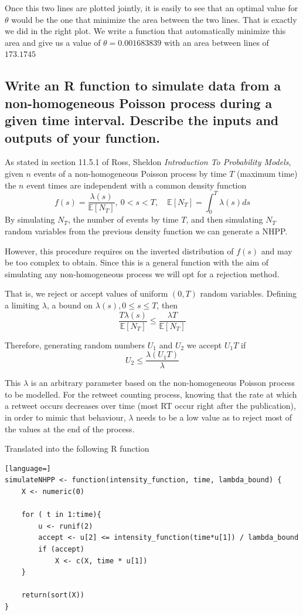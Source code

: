 Once this two lines are plotted jointly, it is easily to see that an optimal value for $\theta$ would be the one that minimize the area between the two lines. 
That is exactly we did in the right plot. 
We write a function that automatically minimize this area and give us a value of $\theta=0.001683839$ with an area between lines of $173.1745$

\subsection{Write an R function to simulate data from a non-homogeneous Poisson process during a given time interval. Describe the inputs and outputs of your function.}

As stated in section 11.5.1 of Ross, Sheldon \textit{Introduction To Probability Models}, given $n$ events of a non-homogeneous Poisson process by time $T$ (maximum time) the $n$ event times are independent with a common density function
\[f(s) = \frac{\lambda(s)}{\mathbb{E}[N_T]},\ 0<s<T, \quad \mathbb{E}[N_T] = \int^T_0\lambda(s)ds\]
By simulating $N_T$, the number of events by time $T$, and then simulating $N_T$ random variables from the previous density function we can generate a NHPP.

However, this procedure requires on the inverted distribution of $f(s)$  and may be too complex to obtain. Since this is a general function with the aim of simulating any non-homogeneous process we will opt for a rejection method.

That is, we reject or accept values of uniform $(0, T)$ random variables. Defining a limiting $\lambda$, a bound on $\lambda(s), 0\leq s \leq T$, then 
\[\frac{T \lambda(s)}{\mathbb{E}[N_T]} \leq \frac{\lambda T}{\mathbb{E}[N_T]} \]

Therefore, generating random numbers $U_1$ and $U_2$ we accept $U_1T$ if
\[U_2 \leq \frac{\lambda(U_1T)}{\lambda}\]

This $\lambda$ is an arbitrary parameter based on the non-homogeneous Poisson process to be modelled. For the retweet counting process, knowing that the rate at which a retweet occurs decreases over time (most RT occur right after the publication), in order to mimic that behaviour, $\lambda$ needs to be a low value as to reject most of the values at the end of the process.

Translated into the following R function
\begin{lstlisting}[language=]
simulateNHPP <- function(intensity_function, time, lambda_bound) {
	X <- numeric(0)
	
	for ( t in 1:time){
		u <- runif(2)
		accept <- u[2] <= intensity_function(time*u[1]) / lambda_bound
		if (accept)
			X <- c(X, time * u[1])
	}
		
	return(sort(X))
}
\end{lstlisting}

